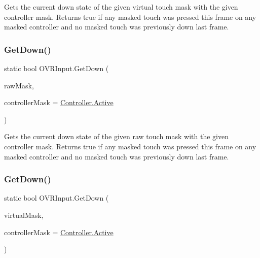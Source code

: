Gets the current down state of the given virtual touch mask with the given controller mask. Returns true if any masked touch was pressed this frame on any masked controller and no masked touch was previously down last frame. 

\mbox{\label{class_o_v_r_input_ae1aeb0251eb70fc326264a720ec2a210}} 
\subsubsection{\texorpdfstring{Get\+Down()}{GetDown()}\hspace{0.1cm}{\footnotesize\ttfamily [4/6]}}
{\footnotesize\ttfamily static bool O\+V\+R\+Input.\+Get\+Down (\begin{DoxyParamCaption}\item[{\mbox{\hyperlink{class_o_v_r_input_a6e130faa2035c5b20853c1177d909cc6}{Raw\+Touch}}}]{raw\+Mask,  }\item[{\mbox{\hyperlink{class_o_v_r_input_a5c86f9052a9cbb0b73779ff5704d60a8}{Controller}}}]{controller\+Mask = {\ttfamily \mbox{\hyperlink{class_o_v_r_input_a5c86f9052a9cbb0b73779ff5704d60a8a4d3d769b812b6faa6b76e1a8abaece2d}{Controller.\+Active}}} }\end{DoxyParamCaption})\hspace{0.3cm}{\ttfamily [static]}}



Gets the current down state of the given raw touch mask with the given controller mask. Returns true if any masked touch was pressed this frame on any masked controller and no masked touch was previously down last frame. 

\mbox{\label{class_o_v_r_input_afb4731b4094d004c6df90d86189cb138}} 
\subsubsection{\texorpdfstring{Get\+Down()}{GetDown()}\hspace{0.1cm}{\footnotesize\ttfamily [5/6]}}
{\footnotesize\ttfamily static bool O\+V\+R\+Input.\+Get\+Down (\begin{DoxyParamCaption}\item[{\mbox{\hyperlink{class_o_v_r_input_afa31aa573064be9bab8fc9e58cddeab6}{Near\+Touch}}}]{virtual\+Mask,  }\item[{\mbox{\hyperlink{class_o_v_r_input_a5c86f9052a9cbb0b73779ff5704d60a8}{Controller}}}]{controller\+Mask = {\ttfamily \mbox{\hyperlink{class_o_v_r_input_a5c86f9052a9cbb0b73779ff5704d60a8a4d3d769b812b6faa6b76e1a8abaece2d}{Controller.\+Active}}} }\end{DoxyParamCaption})\hspace{0.3cm}{\ttfamily [static]}}



